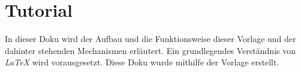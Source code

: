 \documentclass[12pt]{article}
\begin{document}
\renewcommand{\mytitle}{Dokumentation/Tutorial}%
\renewcommand{\myauthor}{Dr. Frank N. Furter}%



\frontmatter%


\printabbreviations%
\clearpage
\renewcommand{\plaintitle}{Abbildungsverzeichnis}
{\def\makebox[#1][#2]#3{#3}%
\listoffigures
}
\clearpage
\renewcommand{\plaintitle}{Tabellenverzeichnis}
{\def\makebox[#1][#2]#3{#3}%
\listoftables
}
\clearpage
\renewcommand{\plaintitle}{Inhaltsverzeichnis}%
{\def\makebox[#1][#2]#3{#3}%
	\tableofcontents
}


\clearpage
\mainmatter%

\part{Tutorial}
In dieser Doku wird der Aufbau und die Funktionsweise dieser Vorlage und der dahinter stehenden Mechanismen erläutert. Ein grundlegendes Verständnis von \textit{LaTeX} wird vorausgesetzt. Diese Doku wurde mithilfe der Vorlage erstellt.
\end{document}
